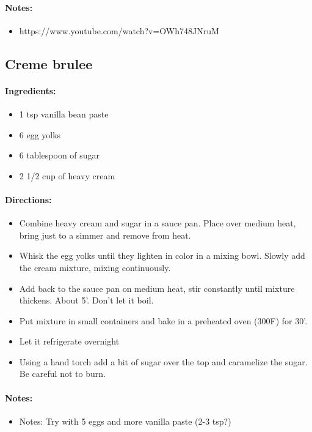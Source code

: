 \documentclass{article}
\begin{document}
\paragraph{Notes:}
\begin{itemize}
    \item https://www.youtube.com/watch?v=OWh748JNruM
\end{itemize}

\subsection{Creme brulee}

\paragraph{Ingredients:}
\begin{itemize}
    \item 1 tsp vanilla bean paste
    \item 6 egg yolks
    \item 6 tablespoon of sugar
    \item 2 1/2 cup of heavy cream
\end{itemize}

\paragraph{Directions:}
\begin{itemize}
    \item Combine heavy cream and sugar in a sauce pan. Place over medium heat, bring just to a simmer and remove from heat.
    \item Whisk the egg yolks until they lighten in color in a mixing bowl. Slowly add the cream mixture, mixing continuously.
    \item Add back to the sauce pan on medium heat, stir constantly until mixture thickens. About 5'. Don't let it boil.
    \item Put mixture in small containers and bake in a preheated oven (300F) for 30'.
    \item Let it refrigerate overnight
    \item Using a hand torch add a bit of sugar over the top and caramelize the sugar. Be careful not to burn.
\end{itemize}

\paragraph{Notes:}
\begin{itemize}
    \item Notes: Try with 5 eggs and more vanilla paste (2-3 tsp?)
\end{itemize}
\end{document}
